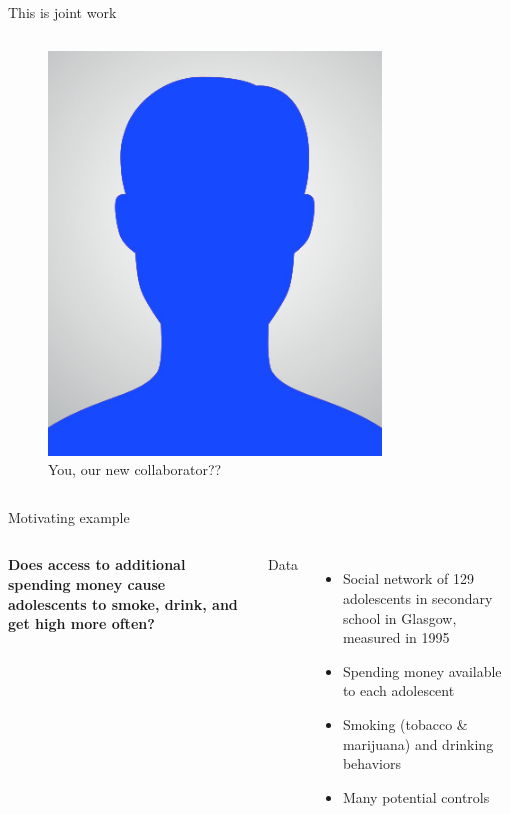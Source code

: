 \documentclass{beamer}
\theoremstyle{remark}
\begin{document}
\begin{frame}{This is joint work}
\begin{columns}
        \begin{figure}
            \includegraphics[width=0.9\textwidth]{figures/mystery-person2.jpg}
            \caption{You, our new collaborator??}
        \end{figure}

    \end{columns}

\end{frame}

\begin{frame}{Motivating example}

    \begin{columns}


        \textbf{Does access to additional spending money cause adolescents to smoke, drink, and get high more often?}


        Data

        \begin{itemize}
            \item Social network of 129 adolescents in secondary school in Glasgow, measured in 1995
            \item Spending money available to each adolescent
            \item Smoking (tobacco \& marijuana) and drinking behaviors
            \item Many potential controls
        \end{itemize}

    \end{columns}

\end{frame}
\end{document}
